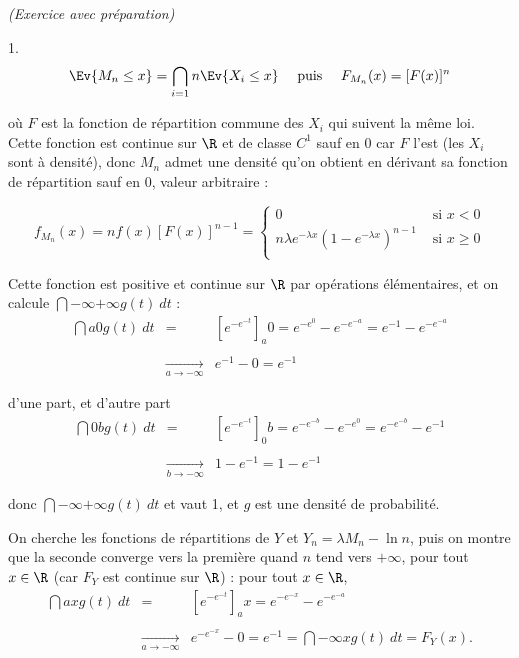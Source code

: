 \documentclass[11pt]{article}%
\begin{document}
\begin{exercice}{\it (Exercice avec préparation)}
\begin{noliste}{1.}
\[
 \Ev{ M_{n} \leq x } = \bigcap\limits_{ i = 1 }{n} \Ev{X_{i} \leq x } \
\ \ \text{ puis } \ \ \ F_{ M_{n} } (x) = [ F(x) ]^{n} 
\]

 où $F$ est la fonction de répartition commune des $X_{i}$ qui suivent
la même loi. Cette fonction est continue sur $\R$ et de classe $C^{1}$
sauf en 0 car $F$ l'est (les $X_{i}$ sont à densité), donc $M_{n}$
admet une densité qu'on obtient en dérivant sa fonction de répartition
sauf en 0, valeur arbitraire :
 
\[
 f_{ M_{n} } (x) = n f(x) [ F(x) ]^{n-1} = \left\{ 
\begin{array}{cl}
 0 & \text{ si } x < 0 \\
n \lambda e^{ - \lambda x } \left( 1 - e^{ - \lambda x } \right)^{ n-1
} & \text{ si } x \geq 0 \\
\end{array}
\right. 
\]



 \item Cette fonction est positive et continue sur $\R$ par opérations
élémentaires, et on calcule $\dint{-\infty}{+ \infty} g(t) \ dt$ : 
 \begin{eqnarray*}
   \dint{a}{0} g(t) \ dt & = & \left[ e^{ - e^{ - t } } \right]_{a}{0} =
   e^{ - e^{0} } - e^{ - e^{ - a } } = e^{ - 1 } - e^{ - e^{ - a } } \\
   \\
   & \xrightarrow[ a \rightarrow - \infty ]{} & e^{ - 1 } - 0 = e^{ - 1 }
\end{eqnarray*}

 d'une part, et d'autre part
 \begin{eqnarray*}
 \dint{0}{b} g(t) \ dt & = & \left[ e^{ - e^{ - t } } \right]_{0}{b} =
e^{ - e^{ - b } } - e^{ - e^{0} } = e^{ - e^{ - b } } - e^{ - 1 } \\
\\
 & \xrightarrow[ b \rightarrow - \infty ]{} & 1 - e^{ - 1 } = 1 - e^{ -
1 } \end{eqnarray*}

 donc $\dint{-\infty}{+ \infty} g(t) \ dt$ et vaut 1, et $g$ est une
densité de probabilité. \\

 \item On cherche les fonctions de répartitions de $Y$ et $ Y_{n} =
\lambda M_{n} - \ln n$, puis on montre que la seconde converge vers la
première quand $n$ tend vers $ + \infty$, pour tout $x \in \R$ (car
$F_{Y}$ est continue sur $\R$) : pour tout $x \in \R$,
 \begin{eqnarray*}
 \dint{a}{x} g(t) \ dt & = & \left[ e^{ - e^{ - t } } \right]_{a}{x} =
e^{ - e^{ - x } } - e^{ - e^{ - a } } \\
\\
 & \xrightarrow[ a \rightarrow - \infty ]{} & e^{ - e^{ - x } } - 0 =
e^{ - 1 } = \dint{- \infty}{x} g(t) \ dt = F_{Y} (x).\end{eqnarray*}


\end{noliste}
\end{exercice}
\end{document}
